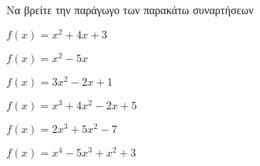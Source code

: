 Να βρείτε την παράγωγο των παρακάτω συναρτήσεων
\begin{multicols}{2}
\begin{alist}
\item $ f(x)=x^2+4x+3 $
\item $ f(x)=x^2-5x $
\item $ f(x)=3x^2-2x+1 $
\item $ f(x)=x^3+4x^2-2x+5 $
\item $ f(x)=2x^3+5x^2-7 $
\item $ f(x)=x^4-5x^3+x^2+3 $
\end{alist}
\end{multicols}
